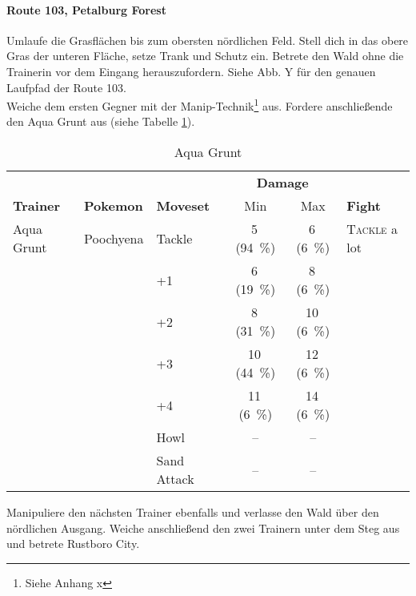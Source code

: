\documentclass[11pt,a4paper,titlepage]{article}
\begin{document}
\paragraph{Route 103, Petalburg Forest}
Umlaufe die Grasflächen bis zum obersten nördlichen Feld. Stell dich in das obere Gras der unteren Fläche, setze Trank und Schutz ein. Betrete den Wald ohne die Trainerin vor dem Eingang herauszufordern. Siehe Abb. Y für den genauen Laufpfad der Route 103.\\
Weiche dem ersten Gegner mit der Manip-Technik\footnote{Siehe Anhang x} aus. Fordere anschließende den Aqua Grunt aus (siehe Tabelle \ref{tab:aquagrunt}).
\begin{table}[htbp]
	\caption{Aqua Grunt}
	\label{tab:aquagrunt}
	\centering
	\begin{tabular}{lllccl}
		\toprule 
		&&&\multicolumn{2}{c}{\textbf{Damage}}&\\
		\cmidrule(rl){4-5}
		\textbf{Trainer}&\textbf{Pokemon}&\textbf{Moveset}&Min&Max&\textbf{Fight}\\ 
		\midrule
		Aqua Grunt&Poochyena&Tackle&5\,(\SI{94}{\percent})&6\,(\SI{6}{\percent})&\textsc{Tackle} a lot\\
		&&+1&6\,(\SI{19}{\percent})&8\,(\SI{6}{\percent})&\\ 
		&&+2&8\,(\SI{31}{\percent})&10\,(\SI{6}{\percent})&\\
		&&+3&10\,(\SI{44}{\percent})&12\,(\SI{6}{\percent})&\\
		&&+4&11\,(\SI{6}{\percent})&14\,(\SI{6}{\percent})&\\
		&&Howl&--&--&\\
		&&Sand Attack&--&--&\\
		\bottomrule
	\end{tabular}
\end{table}
Manipuliere den nächsten Trainer ebenfalls und verlasse den Wald über den nördlichen Ausgang. Weiche anschließend den zwei Trainern unter dem Steg aus und betrete Rustboro City.
\end{document}

